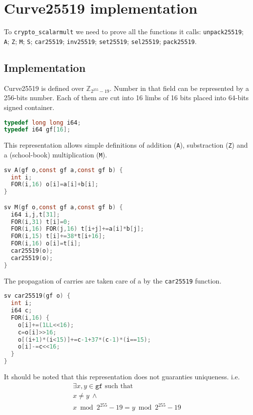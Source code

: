 \section{Curve25519 implementation}

To \texttt{crypto\_scalarmult} we need to prove all the functions it calls:
\texttt{unpack25519}; \texttt{A}; \texttt{Z}; \texttt{M}; \texttt{S};
\texttt{car25519}; \texttt{inv25519}; \texttt{set25519}; \texttt{sel25519};
\texttt{pack25519}.

\subsection{Implementation}

Curve25519 is defined over $\mathbb{Z}_{2^{255}-19}$. Number in that field can
be represented by a 256-bits number. Each of them are cut into 16 limbs of 16
bits placed into 64-bits signed container.
\begin{lstlisting}[language=C]
typedef long long i64;
typedef i64 gf[16];
\end{lstlisting}

This representation allows simple definitions of addition (\texttt{A}),
substraction (\texttt{Z}) and a (school-book) multiplication (\texttt{M}).
\begin{lstlisting}[language=C]
sv A(gf o,const gf a,const gf b) {
  int i;
  FOR(i,16) o[i]=a[i]+b[i];
}

sv M(gf o,const gf a,const gf b) {
  i64 i,j,t[31];
  FOR(i,31) t[i]=0;
  FOR(i,16) FOR(j,16) t[i+j]+=a[i]*b[j];
  FOR(i,15) t[i]+=38*t[i+16];
  FOR(i,16) o[i]=t[i];
  car25519(o);
  car25519(o);
}
\end{lstlisting}

The propagation of carries are taken care of a by the \texttt{car25519} function.
\begin{lstlisting}[language=C]
sv car25519(gf o) {
  int i;
  i64 c;
  FOR(i,16) {
    o[i]+=(1LL<<16);
    c=o[i]>>16;
    o[(i+1)*(i<15)]+=c-1+37*(c-1)*(i==15);
    o[i]-=c<<16;
  }
}
\end{lstlisting}

It should be noted that this representation does not guaranties uniqueness. i.e.
\begin{align*}
  \exists x,y \in \texttt{gf} \text{ such that }\\
  x \neq y\ \land \\
  x \bmod{2^{255}-19} = y \bmod{2^{255}-19}
\end{align*}

